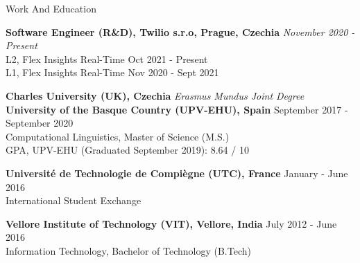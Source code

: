 \documentclass{resume} %
\begin{document}


    
\begin{rSection}{Work And Education}

    {\bf{Software Engineer (R\&D), Twilio s.r.o, Prague, Czechia}}
        \hfill {\em November 2020 - Present}\\
            L2, Flex Insights Real-Time \hfill Oct 2021 - Present\\
            L1, Flex Insights Real-Time \hfill Nov 2020 - Sept 2021
    
    {\bf Charles University (UK), Czechia} \hfill
        {\em Erasmus Mundus Joint Degree}\\
    {\bf University of the Basque Country (UPV-EHU), Spain} \hfill
        {September 2017 - September 2020}\\
            Computational Linguistics, Master of Science (M.S.)\\
            GPA, UPV-EHU (Graduated September 2019): 8.64 / 10%
    
    {\bf Universit\'e de Technologie de Compi\`egne (UTC), France} \hfill
        {January - June 2016}\\
            International Student Exchange
    
    {\bf Vellore Institute of Technology (VIT), Vellore, India} \hfill
        {July 2012 - June 2016}\\
            Information Technology, Bachelor of Technology (B.Tech)

\end{rSection}


\end{document}
